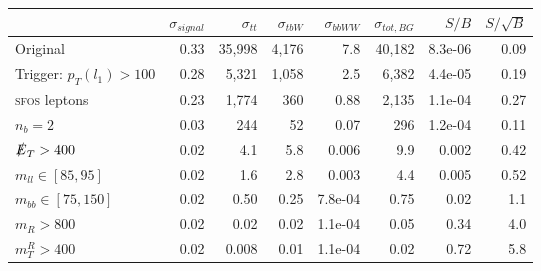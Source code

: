 \begin{tabular}{lrrrrrrr}
\toprule
{} &  $\sigma_{signal}$     &  $\sigma_{tt}$     &  $\sigma_{tbW}$ &  $\sigma_{bbWW}$ &  $\sigma_{tot, BG}$ &   $S/B$ &  $S/\sqrt{B}$ \\
\midrule
Original                    &               0.33 &         35,998 &           4,176 &              7.8 &             40,182 & 8.3e-06 &          0.09 \\
Trigger: $p_T(l_1) > 100$   &               0.28 &          5,321 &           1,058 &              2.5 &              6,382 & 4.4e-05 &          0.19 \\
\textsc{sfos} leptons       &               0.23 &          1,774 &             360 &             0.88 &              2,135 & 1.1e-04 &          0.27 \\
$n_b = 2$                   &               0.03 &            244 &              52 &             0.07 &                296 & 1.2e-04 &          0.11 \\
$\slashed{E}_T > 400$       &               0.02 &            4.1 &             5.8 &            0.006 &                9.9 &   0.002 &          0.42 \\
$m_{ll} \in [85,95]$        &               0.02 &            1.6 &             2.8 &            0.003 &                4.4 &   0.005 &          0.52 \\
$m_{bb} \in [75,150]$       &               0.02 &           0.50 &            0.25 &          7.8e-04 &               0.75 &    0.02 &           1.1 \\
$m_{R} > 800$               &               0.02 &           0.02 &            0.02 &          1.1e-04 &               0.05 &    0.34 &           4.0 \\
$m_{T}^{R} > 400$           &               0.02 &          0.008 &            0.01 &          1.1e-04 &               0.02 &    0.72 &           5.8 \\
\bottomrule
\end{tabular}
